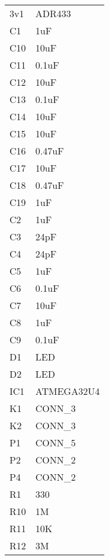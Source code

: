 \documentclass{article}
\begin{document}
\begin{center}
\begin{tabular}{ll}
 3v1  &  ADR433      \\
 C1   &  1uF         \\
 C10  &  10uF        \\
 C11  &  0.1uF       \\
 C12  &  10uF        \\
 C13  &  0.1uF       \\
 C14  &  10uF        \\
 C15  &  10uF        \\
 C16  &  0.47uF      \\
 C17  &  10uF        \\
 C18  &  0.47uF      \\
 C19  &  1uF         \\
 C2   &  1uF         \\
 C3   &  24pF        \\
 C4   &  24pF        \\
 C5   &  1uF         \\
 C6   &  0.1uF       \\
 C7   &  10uF        \\
 C8   &  1uF         \\
 C9   &  0.1uF       \\
 D1   &  LED         \\
 D2   &  LED         \\
 IC1  &  ATMEGA32U4  \\
 K1   &  CONN\_{}3   \\
 K2   &  CONN\_{}3   \\
 P1   &  CONN\_{}5   \\
 P2   &  CONN\_{}2   \\
 P4   &  CONN\_{}2   \\
 R1   &  330         \\
 R10  &  1M          \\
 R11  &  10K         \\
 R12  &  3M          \\
\end{tabular}
\end{center}
\end{document}

